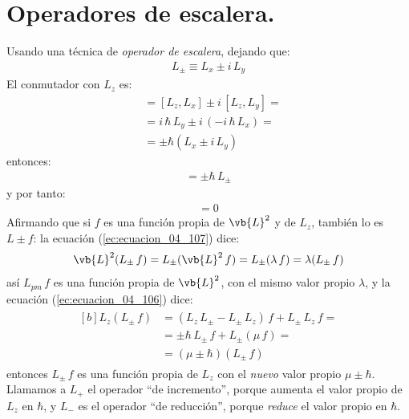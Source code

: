 \section{Operadores de escalera.}
Usando una técnica de \emph{operador de escalera}, dejando que:
\begin{align}
L_{\pm} \equiv L_{x} \pm i \, L_{y}
\label{eq:ecuacion_04_105}
\end{align}
El conmutador con $L_{z}$ es:
\begin{align*}
[L_{z}, L_{\pm}] &= [L_{z}, L_{x}] \pm i \, [L_{z}, L_{y}] = \\[0.5em]
&= i \, \hbar \, L_{y} \pm i \, (- i \,\hbar \, L_{x}) = \\[0.5em]
&= \pm \hbar (L_{x} \pm i \, L_{y})
\end{align*}
entonces:
\begin{align}
[L_{z}, L_{\pm}] = \pm \hbar \, L_{\pm}
\label{ec:ecuacion_04_106}
\end{align}
y por tanto:
\begin{align}
[\vb{L}^{2}, L_{\pm}] = 0
\label{ec:ecuacion_04_107}
\end{align}
Afirmando que si $f$ es una función propia de $\vb{L}^{2}$ y de $L_{z}$, también lo es $L \pm f$: la ecuación (\ref{ec:ecuacion_04_107}) dice:
\begin{align}
\vb{L}^{2} (L_{\pm} \, f) = L_{\pm} (\vb{L}^{2} \, f) = L_{\pm} (\lambda \, f) = \lambda (L_{\pm} \, f)
\label{eq:ecuacion_04_108}
\end{align}
así $L_{pm} \, f$ es una función propia de $\vb{L}^{2}$, con el mismo valor propio $\lambda$, y la ecuación (\ref{ec:ecuacion_04_106}) dice:
\begin{align}
\begin{aligned}[b]
L_{z} (L_{\pm} \, f) &= (L_{z} \, L_{\pm} - L_{\pm} \, L_{z}) \, f + L_{\pm} \, L_{z} \, f = \\[0.5em]
&= \pm \hbar \, L_{\pm} \, f + L_{\pm} (\mu \, f) = \\[0.5em]
&= (\mu \pm \hbar) (L_{\pm} \, f)
\end{aligned}
\label{eq:ecuacion_04_109}
\end{align}
entonces $L_{\pm} \, f$ es una función propia de $L_{z}$ con el \emph{nuevo} valor propio $\mu \pm \hbar$. Llamamos a $L_{+}$ el operador \enquote{de incremento}, porque aumenta el valor propio de $L_{z}$ en $\hbar$, y $L_{-}$ es el operador \enquote{de reducción}, porque \emph{reduce} el valor propio en $\hbar$.
\vspace*{-1cm}
